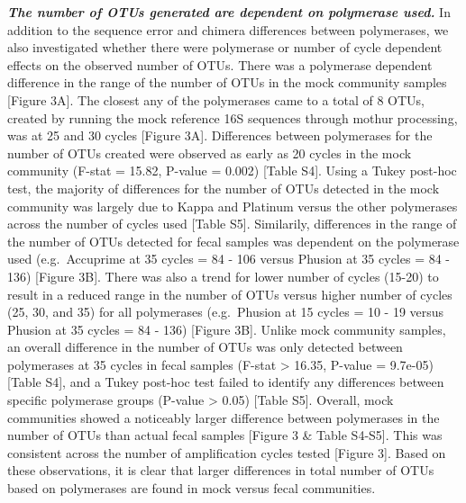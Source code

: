 \documentclass[11pt,]{article}
\begin{document}
\textbf{\emph{The number of OTUs generated are dependent on polymerase
used.}} In addition to the sequence error and chimera differences
between polymerases, we also investigated whether there were polymerase
or number of cycle dependent effects on the observed number of OTUs.
There was a polymerase dependent difference in the range of the number
of OTUs in the mock community samples {[}Figure 3A{]}. The closest any
of the polymerases came to a total of 8 OTUs, created by running the
mock reference 16S sequences through mothur processing, was at 25 and 30
cycles {[}Figure 3A{]}. Differences between polymerases for the number
of OTUs created were observed as early as 20 cycles in the mock
community (F-stat = 15.82, P-value = 0.002) {[}Table S4{]}. Using a
Tukey post-hoc test, the majority of differences for the number of OTUs
detected in the mock community was largely due to Kappa and Platinum
versus the other polymerases across the number of cycles used {[}Table
S5{]}. Similarily, differences in the range of the number of OTUs
detected for fecal samples was dependent on the polymerase used
(e.g.~Accuprime at 35 cycles = 84 - 106 versus Phusion at 35 cycles = 84
- 136) {[}Figure 3B{]}. There was also a trend for lower number of
cycles (15-20) to result in a reduced range in the number of OTUs versus
higher number of cycles (25, 30, and 35) for all polymerases
(e.g.~Phusion at 15 cycles = 10 - 19 versus Phusion at 35 cycles = 84 -
136) {[}Figure 3B{]}. Unlike mock community samples, an overall
difference in the number of OTUs was only detected between polymerases
at 35 cycles in fecal samples (F-stat \textgreater{} 16.35, P-value =
9.7e-05) {[}Table S4{]}, and a Tukey post-hoc test failed to identify
any differences between specific polymerase groups (P-value
\textgreater{} 0.05) {[}Table S5{]}. Overall, mock communities showed a
noticeably larger difference between polymerases in the number of OTUs
than actual fecal samples {[}Figure 3 \& Table S4-S5{]}. This was
consistent across the number of amplification cycles tested {[}Figure
3{]}. Based on these observations, it is clear that larger differences
in total number of OTUs based on polymerases are found in mock versus
fecal communities.
\end{document}
